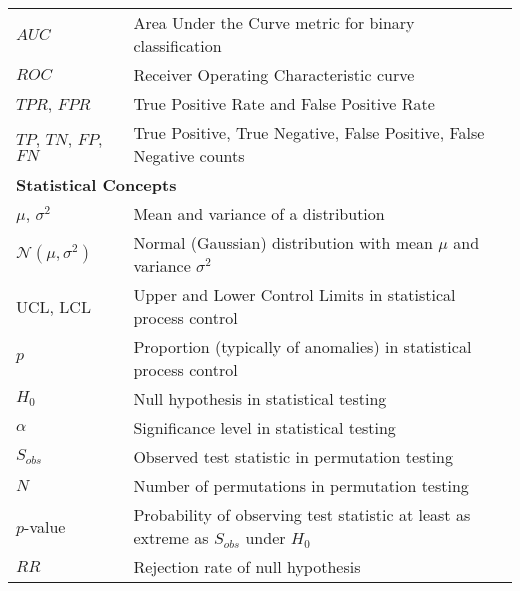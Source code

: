 \begin{appendices}
\begin{table}[htbp]
{\begin{tabular}{p{}p{}}
        $AUC$                                       & Area Under the Curve metric for binary classification                                \\
        $ROC$                                       & Receiver Operating Characteristic curve                                              \\
        $TPR$, $FPR$                                & True Positive Rate and False Positive Rate                                           \\
        $TP$, $TN$, $FP$, $FN$                      & True Positive, True Negative, False Positive, False Negative counts                  \\
        \midrule
        \multicolumn{2}{l}{\textbf{Statistical Concepts}}                                                                                  \\
        \midrule
        $\mu$, $\sigma^2$                           & Mean and variance of a distribution                                                  \\
        $\mathcal{N}(\mu,\sigma^2)$                 & Normal (Gaussian) distribution with mean $\mu$ and variance $\sigma^2$               \\
        $\text{UCL}$, $\text{LCL}$                  & Upper and Lower Control Limits in statistical process control                        \\
        $p$                                         & Proportion (typically of anomalies) in statistical process control                   \\
        $H_0$                                       & Null hypothesis in statistical testing                                               \\
        $\alpha$                                    & Significance level in statistical testing                                            \\
        $S_{obs}$                                   & Observed test statistic in permutation testing                                       \\
        $N$                                         & Number of permutations in permutation testing                                        \\
        $p$-value                                   & Probability of observing test statistic at least as extreme as $S_{obs}$ under $H_0$ \\
        $RR$                                        & Rejection rate of null hypothesis                                                    \\

\end{tabular}}
\end{table}
\end{appendices}
